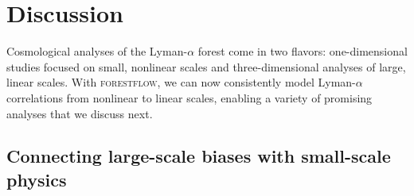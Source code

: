 \documentclass[longauth]{aa}
\newcommand{\lya}{Lyman-$\alpha$\xspace}
\newcommand{\forestflow}{\textsc{forestflow}\xspace}
\begin{document}

\section{Discussion}
\label{sec:discussion}

Cosmological analyses of the \lya forest come in two flavors: one-dimensional studies focused on small, nonlinear scales and three-dimensional analyses of large, linear scales. With \forestflow, we can now consistently model \lya correlations from nonlinear to linear scales, enabling a variety of promising analyses that we discuss next.


\subsection{Connecting large-scale biases with small-scale physics}
\label{sec:discussion_large_small}
\end{document}
